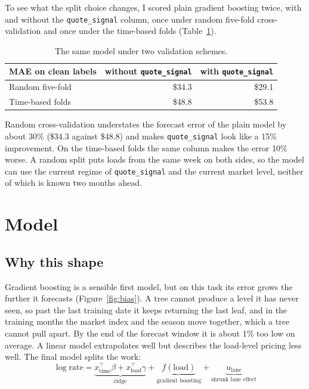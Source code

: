 \documentclass[11pt]{article}
\newcommand{\code}[1]{\texttt{#1}}
\begin{document}
To see what the split choice changes, I scored plain gradient boosting twice, with and
without the \code{quote\_signal} column, once under random five-fold cross-validation and
once under the time-based folds (Table~\ref{tab:random}).

\begin{table}[h]
\centering\small
\begin{tabular}{lrr}
\toprule
MAE on clean labels & without \code{quote\_signal} & with \code{quote\_signal} \\
\midrule
Random five-fold & \$34.3 & \$29.1 \\
Time-based folds & \$48.8 & \$53.8 \\
\bottomrule
\end{tabular}
\caption{The same model under two validation schemes.}
\label{tab:random}
\end{table}

Random cross-validation understates the forecast error of the plain model by about 30\%
(\$34.3 against \$48.8) and makes \code{quote\_signal} look like a 15\% improvement. On the
time-based folds the same column makes the error 10\% worse. A random split puts loads
from the same week on both sides, so the model can use the current regime of
\code{quote\_signal} and the current market level, neither of which is known two months
ahead.

\section{Model}

\subsection{Why this shape}

Gradient boosting is a sensible first model, but on this task its error grows the further
it forecasts (Figure~\ref{fig:bias}). A tree cannot produce a level it has never seen, so
past the last training date it keeps returning the last leaf, and in the training months
the market index and the season move together, which a tree cannot pull apart. By the end
of the forecast window it is about 1\% too low on average. A linear model extrapolates
well but describes the load-level pricing less well. The final model splits the work:
\[
\log \text{rate} = \underbrace{x_{\text{time}}^\top\beta + x_{\text{load}}^\top\gamma}_{\text{ridge}}
+ \underbrace{f(\text{load})}_{\text{gradient boosting}}
+ \underbrace{u_{\text{lane}}}_{\text{shrunk lane effect}}
\]
\end{document}
